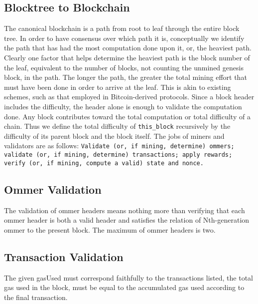 \documentclass[10pt,a4paper,leqno,bibliography=totoc]{scrartcl}
\newenvironment{alphafootnotes}
{\par\edef\savedfootnotenumber{\number\value{footnote}}
\renewcommand{\thefootnote}{\alph{footnote}}
\setcounter{footnote}{0}}
{\par\setcounter{footnote}{\savedfootnotenumber}}
\begin{document}
\begin{alphafootnotes}
\begin{multicols*}{2}
\subsection{Blocktree to Blockchain}
		
		The canonical blockchain is a path from root to leaf through the entire block tree. In order to have consensus over which path it is, conceptually we identify the path that has had the most computation done upon it, or, the heaviest path. Clearly one factor that helps determine the heaviest path is the block number of the leaf, equivalent to the number of blocks, not counting the unmined genesis block, in the path. The longer the path, the greater the total mining effort that must have been done in order to arrive at the leaf. This is akin to existing schemes, such as that employed in Bitcoin-derived protocols. Since a block header includes the difficulty, the header alone is enough to validate the computation done. Any block contributes toward the total computation or total difficulty of a chain. Thus we define the total difficulty of \texttt{this\_block} recursively by the difficulty of its parent block and the block itself.
		The jobs of miners and validators are as follows: \texttt{Validate (or, if mining, determine) ommers; validate (or, if mining, determine) transactions; apply rewards; verify (or, if mining, compute a valid) state and nonce.} 

		\subsection{Ommer Validation} The validation of ommer headers means nothing more than verifying that each ommer header is both a valid header and satisfies the relation of Nth-generation ommer to the present block. The maximum of ommer headers is two. 
		\subsection{Transaction Validation} The given gasUsed must correspond faithfully to the transactions listed, the total gas used in the block, must be equal to the accumulated gas used according to the final transaction.

\end{multicols*}
\end{alphafootnotes}
\end{document}
